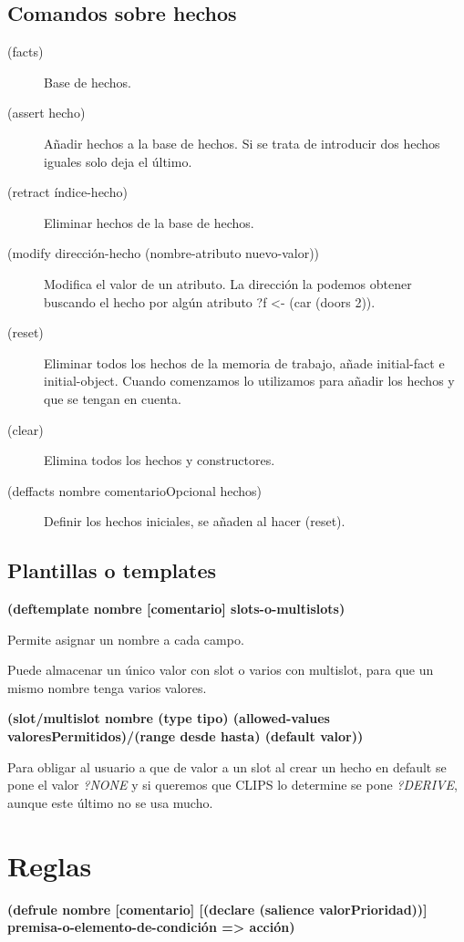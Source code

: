 \documentclass[12pt, twoside, openright]{report} %
\begin{document}
\subsection{Comandos sobre hechos}
\begin{description}
	\item[(facts)] Base de hechos.
	\item[(assert hecho)] Añadir hechos a la base de hechos. Si se trata de introducir dos hechos iguales solo deja el último.
	\item[(retract índice-hecho)] Eliminar hechos de la base de hechos.
	\item[(modify dirección-hecho (nombre-atributo nuevo-valor))] Modifica el valor de un atributo. La dirección la podemos obtener buscando el hecho por algún atributo ?f <- (car (doors 2)).
	\item[(reset)] Eliminar todos los hechos de la memoria de trabajo, añade initial-fact e initial-object. Cuando comenzamos lo utilizamos para añadir los hechos y que se tengan en cuenta.
	\item[(clear)] Elimina todos los hechos y constructores.
	\item[(deffacts nombre comentarioOpcional hechos)] Definir los hechos iniciales, se añaden al hacer (reset).
\end{description}

\subsection{Plantillas o templates}
\textbf{(deftemplate nombre [comentario] slots-o-multislots)}

Permite asignar un nombre a cada campo.

Puede almacenar un único valor con slot o varios con multislot, para que un mismo nombre tenga varios valores.

\textbf{(slot/multislot nombre (type tipo) (allowed-values valoresPermitidos)/(range desde hasta) (default valor))}

Para obligar al usuario a que de valor a un slot al crear un hecho en default se pone el valor \textit{?NONE} y si queremos que CLIPS lo determine se pone \textit{?DERIVE}, aunque este último no se usa mucho.

\pagebreak
\section{Reglas}
\textbf{(defrule nombre [comentario] [(declare (salience valorPrioridad))] premisa-o-elemento-de-condición => acción)}
\end{document}
